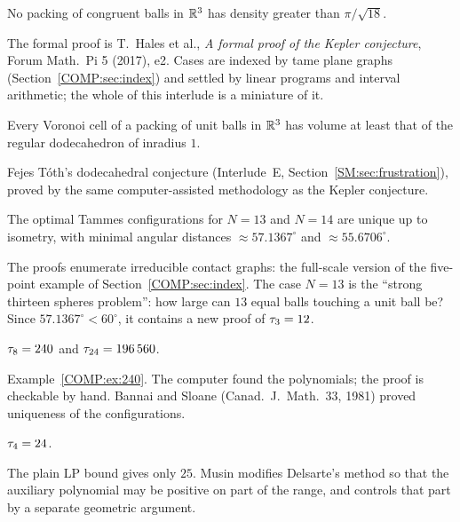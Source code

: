 \begin{theorem}
No packing of congruent balls in $\mathbb{R}^3$ has density greater than $\pi/\sqrt{18}$.
\end{theorem}
\noindent The formal proof is T.~Hales et al., \emph{A formal proof of the Kepler conjecture}, Forum Math.\ Pi 5
(2017), e2. Cases are indexed by tame plane graphs (Section~\ref{COMP:sec:index}) and settled by linear programs
and interval arithmetic; the whole of this interlude is a miniature of it.

\begin{theorem}
Every Voronoi cell of a packing of unit balls in $\mathbb{R}^3$ has volume at least that of the regular dodecahedron
of inradius $1$.
\end{theorem}
\noindent Fejes T\'oth's dodecahedral conjecture (Interlude~E, Section~\ref{SM:sec:frustration}), proved by the
same computer-assisted methodology as the Kepler conjecture.

\begin{theorem}
The optimal Tammes configurations for $N=13$ and $N=14$ are unique up to isometry, with minimal angular
distances $\approx57.1367^\circ$ and $\approx55.6706^\circ$.
\end{theorem}
\noindent The proofs enumerate irreducible contact graphs: the full-scale version of the five-point example of
Section~\ref{COMP:sec:index}. The case $N=13$ is the ``strong thirteen spheres problem'': how large can $13$ equal balls touching a unit ball
be? Since $57.1367^\circ<60^\circ$, it contains a new proof of $\tau_3=12$.

\begin{theorem}
$\tau_8=240$ and $\tau_{24}=196\,560$.
\end{theorem}
\noindent Example~\ref{COMP:ex:240}. The computer found the polynomials; the proof is checkable by hand.
Bannai and Sloane (Canad.\ J.\ Math.\ 33, 1981) proved uniqueness of the configurations.

\begin{theorem}
$\tau_4=24$.
\end{theorem}
\noindent The plain LP bound gives only $25$. Musin modifies Delsarte's method so that the auxiliary polynomial
may be positive on part of the range, and controls that part by a separate geometric argument.


